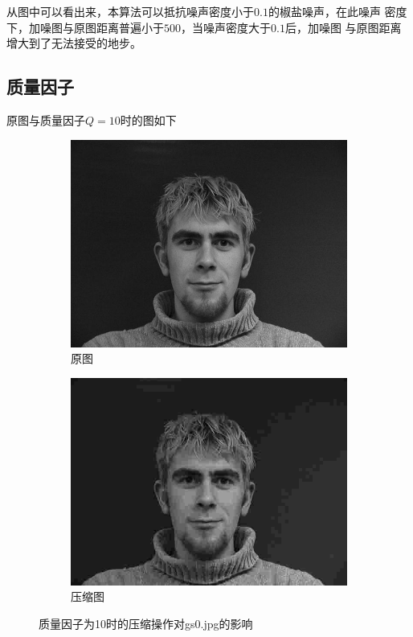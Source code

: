 从图中可以看出来，本算法可以抵抗噪声密度小于$0.1$的椒盐噪声，在此噪声
密度下，加噪图与原图距离普遍小于$500$，当噪声密度大于$0.1$后，加噪图
与原图距离增大到了无法接受的地步。

\subsection{质量因子}
\label{sec:quality-data}

原图与质量因子$Q = 10$时的图如下
\begin{figure}[H]
  \centering
  \begin{subfigure}[b]{0.4\textwidth}
    \includegraphics[keepaspectratio=true,
    width=\textwidth]{images/gs0.jpg}
    \caption{原图}
  \end{subfigure}
  \begin{subfigure}[b]{0.4\textwidth}
    \includegraphics[keepaspectratio=true,
    width=\textwidth]{images/gs0_0.10_quality.jpg}
    \caption{压缩图}
  \end{subfigure}
  \caption{质量因子为10时的压缩操作对gs0.jpg的影响}
\label{fig:quality-ex-img}
\end{figure}

